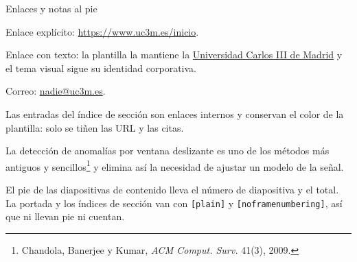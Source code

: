 \documentclass[aspectratio=169,9pt]{beamer}
\begin{document}
\begin{frame}{Enlaces y notas al pie}
\begin{twocols}

  Enlace explícito: \url{https://www.uc3m.es/inicio}.

  Enlace con texto: la plantilla la mantiene la
  \href{https://www.uc3m.es}{Universidad Carlos III de Madrid} y el tema
  visual sigue su identidad corporativa.

  Correo: \href{mailto:nadie@uc3m.es}{nadie@uc3m.es}.


  Las entradas del índice de sección son enlaces internos y conservan el
  color de la plantilla: solo se tiñen las URL y las citas.
\nextcol

  La detección de anomalías por ventana deslizante es uno de los métodos
  más antiguos y sencillos\footnote{Chandola, Banerjee y Kumar,
  \emph{ACM Comput. Surv.} 41(3), 2009.} y elimina así la necesidad de
  ajustar un modelo de la señal.


  El pie de las diapositivas de contenido lleva el número de diapositiva y el
  total. La portada y los índices de sección van con \texttt{[plain]} y
  \texttt{[noframenumbering]}, así que ni llevan pie ni cuentan.
\end{twocols}
\end{frame}
\end{document}
